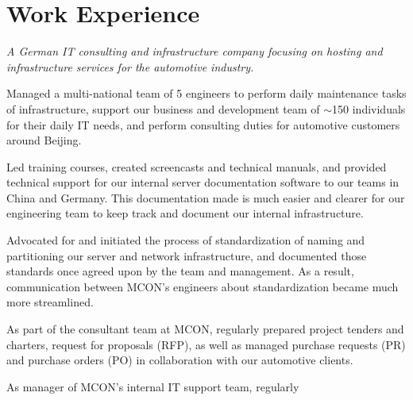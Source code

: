 \documentclass[a4paper]{deedy-resume-proximanova-sanfran} %
\begin{document}
\begin{minipage}[t]{0.66\textwidth} %


\section{Work Experience}


\emph{A German IT consulting and infrastructure company focusing on hosting and infrastructure services for the automotive industry.}
\vspace{\topsep} %
\begin{tightitemize}
\item Managed a multi-national team of 5 engineers to perform daily maintenance tasks of infrastructure, support our business and development team of $\mathtt{\sim}$150 individuals for their daily IT needs, and perform consulting duties for automotive customers around Beijing.
\item Led training courses, created screencasts and technical manuals, and provided technical support for our internal server documentation software to our teams in China and Germany. This documentation made is much easier and clearer for our engineering team to keep track and document our internal infrastructure.
\item Advocated for and initiated the process of standardization of naming and partitioning our server and network infrastructure, and documented those standards once agreed upon by the team and management. As a result, communication between MCON's engineers about standardization became much more streamlined.
\item As part of the consultant team at MCON, regularly prepared project tenders and charters, request for proposals (RFP), as well as managed purchase requests (PR) and purchase orders (PO) in collaboration with our automotive clients.
\item As manager of MCON's internal IT support team, regularly 
\end{tightitemize}

\sectionspace %


\end{minipage}
\end{document}
